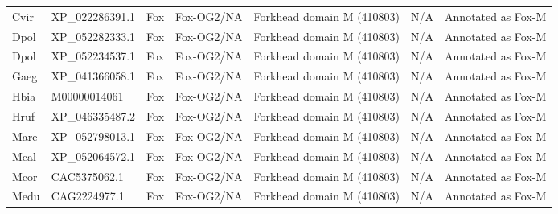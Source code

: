 \documentclass[../main.tex]{subfiles}
\begin{document}
\begin{landscape}
\begin{longtable}{lllllll}
		Cvir           & XP\_022286391.1       & Fox            & Fox-OG2/NA          & Forkhead domain M (410803)                  & N/A                                                                    & Annotated as Fox-M   \\
		Dpol           & XP\_052282333.1       & Fox            & Fox-OG2/NA          & Forkhead domain M (410803)                  & N/A                                                                    & Annotated as Fox-M   \\
		Dpol           & XP\_052234537.1       & Fox            & Fox-OG2/NA          & Forkhead domain M (410803)                  & N/A                                                                    & Annotated as Fox-M   \\
		Gaeg           & XP\_041366058.1       & Fox            & Fox-OG2/NA          & Forkhead domain M (410803)                  & N/A                                                                    & Annotated as Fox-M   \\
		Hbia           & M00000014061          & Fox            & Fox-OG2/NA          & Forkhead domain M (410803)                  & N/A                                                                    & Annotated as Fox-M   \\
		Hruf           & XP\_046335487.2       & Fox            & Fox-OG2/NA          & Forkhead domain M (410803)                  & N/A                                                                    & Annotated as Fox-M   \\
		Mare           & XP\_052798013.1       & Fox            & Fox-OG2/NA          & Forkhead domain M (410803)                  & N/A                                                                    & Annotated as Fox-M   \\
		Mcal           & XP\_052064572.1       & Fox            & Fox-OG2/NA          & Forkhead domain M (410803)                  & N/A                                                                    & Annotated as Fox-M   \\
		Mcor           & CAC5375062.1          & Fox            & Fox-OG2/NA          & Forkhead domain M (410803)                  & N/A                                                                    & Annotated as Fox-M   \\
		Medu           & CAG2224977.1          & Fox            & Fox-OG2/NA          & Forkhead domain M (410803)                  & N/A                                                                    & Annotated as Fox-M   \\

\end{longtable}
\end{landscape}
\end{document}
